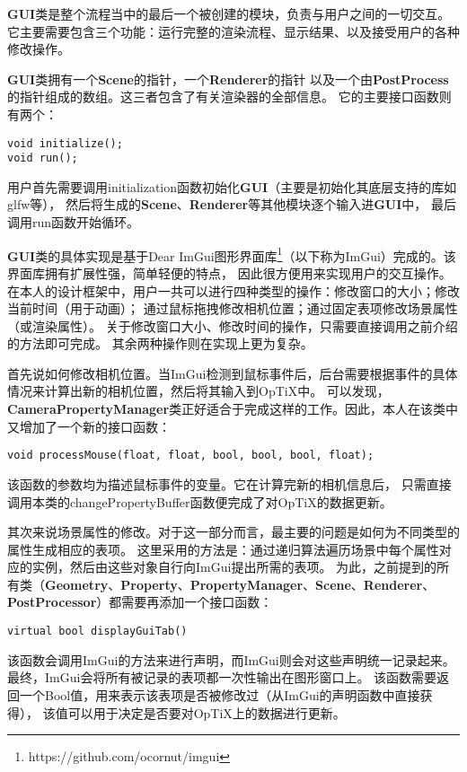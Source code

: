 \textbf{GUI}类是整个流程当中的最后一个被创建的模块，负责与用户之间的一切交互。
它主要需要包含三个功能：运行完整的渲染流程、显示结果、以及接受用户的各种修改操作。

\textbf{GUI}类拥有一个\textbf{Scene}的指针，一个\textbf{Renderer}的指针
以及一个由\textbf{PostProcess}的指针组成的数组。这三者包含了有关渲染器的全部信息。
它的主要接口函数则有两个：
\lstset{language=C++}
\begin{lstlisting}
void initialize();
void run();
\end{lstlisting}

用户首先需要调用initialization函数初始化\textbf{GUI}（主要是初始化其底层支持的库如glfw等），
然后将生成的\textbf{Scene}、\textbf{Renderer}等其他模块逐个输入进\textbf{GUI}中，
最后调用run函数开始循环。

\textbf{GUI}类的具体实现是基于Dear ImGui图形界面库\footnote{https://github.com/ocornut/imgui}（以下称为ImGui）完成的。该界面库拥有扩展性强，简单轻便的特点，
因此很方便用来实现用户的交互操作。在本人的设计框架中，用户一共可以进行四种类型的操作：修改窗口的大小；修改当前时间（用于动画）；
通过鼠标拖拽修改相机位置；通过固定表项修改场景属性（或渲染属性）。
关于修改窗口大小、修改时间的操作，只需要直接调用之前介绍的方法即可完成。
其余两种操作则在实现上更为复杂。

首先说如何修改相机位置。当ImGui检测到鼠标事件后，后台需要根据事件的具体情况来计算出新的相机位置，然后将其输入到OpTiX中。
可以发现，\textbf{CameraPropertyManager}类正好适合于完成这样的工作。因此，本人在该类中又增加了一个新的接口函数：

\lstset{language=C++}
\begin{lstlisting}
void processMouse(float, float, bool, bool, bool, float);
\end{lstlisting}

该函数的参数均为描述鼠标事件的变量。它在计算完新的相机信息后，
只需直接调用本类的changePropertyBuffer函数便完成了对OpTiX的数据更新。

其次来说场景属性的修改。对于这一部分而言，最主要的问题是如何为不同类型的属性生成相应的表项。
这里采用的方法是：通过递归算法遍历场景中每个属性对应的实例，然后由这些对象自行向ImGui提出所需的表项。
为此，之前提到的所有类（\textbf{Geometry}、\textbf{Property}、\textbf{PropertyManager}、\textbf{Scene}、\textbf{Renderer}、\textbf{PostProcessor}）都需要再添加一个接口函数：
\lstset{language=C++}
\begin{lstlisting}
virtual bool displayGuiTab() 
\end{lstlisting}

该函数会调用ImGui的方法来进行声明，而ImGui则会对这些声明统一记录起来。
最终，ImGui会将所有被记录的表项都一次性输出在图形窗口上。
该函数需要返回一个Bool值，用来表示该表项是否被修改过（从ImGui的声明函数中直接获得），
该值可以用于决定是否要对OpTiX上的数据进行更新。
